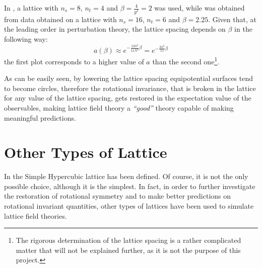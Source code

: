 In , a lattice with $n_s=8$, $n_t=4$ and $\beta=\frac4{g^2}=2$ was used, while  was obtained from data obtained on a lattice with $n_s=16$, $n_t=6$ and $\beta=2.25$.
Given that, at the leading order in perturbation theory, the lattice spacing depends on $\beta$ in the following way:
\begin{equation}
    a(\beta) \approx e^{-\frac{12\pi^2}{11N^2}\beta} = e^{-\frac{3\pi^2}{11}\beta} \label{3:BetaLatticeSpacing} 
\end{equation}
the first plot corresponds to a higher value of $a$ than the second one\footnote{The rigorous determination of the lattice spacing is a rather complicated matter that will not be explained further, as it is not the purpose of this project.}.

As can be easily seen, by lowering the lattice spacing equipotential surfaces tend to become circles, therefore the rotational invariance, that is broken in the lattice for any value of the lattice spacing, gets restored in the expectation value of the observables, making lattice field theory a \emph{``good''} theory capable of making meaningful predictions.

\section{Other Types of Lattice\label{Sec3:Lattices}}
In  the Simple Hypercubic lattice has been defined.
Of course, it is not the only possible choice, although it is the simplest.
In fact, in order to further investigate the restoration of rotational symmetry and to make better predictions on rotational invariant quantities, other types of lattices have been used to simulate lattice field theories.

